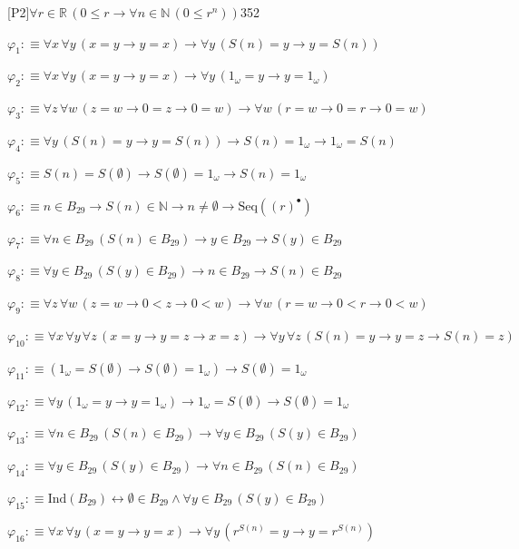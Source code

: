 \begin{fullproof}{[P2]}{$\forall r \in \mathbb{R}\,(0 \leq r \to \forall n \in \mathbb{N}\,(0 \leq {{r}^{n}}))$}{352}
\begin{ptree}
\end{ptree}
\begin{abbrevlist}
\item $\varphi_{1} :\equiv \forall x\,\forall y\,(x = y \to y = x) \to \forall y\,(S(n) = y \to y = S(n))$
\item $\varphi_{2} :\equiv \forall x\,\forall y\,(x = y \to y = x) \to \forall y\,(1_{\omega} = y \to y = 1_{\omega})$
\item $\varphi_{3} :\equiv \forall z\,\forall w\,(z = w \to 0 = z \to 0 = w) \to \forall w\,(r = w \to 0 = r \to 0 = w)$
\item $\varphi_{4} :\equiv \forall y\,(S(n) = y \to y = S(n)) \to S(n) = 1_{\omega} \to 1_{\omega} = S(n)$
\item $\varphi_{5} :\equiv S(n) = S(\emptyset) \to S(\emptyset) = 1_{\omega} \to S(n) = 1_{\omega}$
\item $\varphi_{6} :\equiv n \in B_{29} \to S(n) \in \mathbb{N} \to n \neq \emptyset \to \mathrm{Seq}({(r)^{\bullet}})$
\item $\varphi_{7} :\equiv \forall n \in B_{29}\,(S(n) \in B_{29}) \to y \in B_{29} \to S(y) \in B_{29}$
\item $\varphi_{8} :\equiv \forall y \in B_{29}\,(S(y) \in B_{29}) \to n \in B_{29} \to S(n) \in B_{29}$
\item $\varphi_{9} :\equiv \forall z\,\forall w\,(z = w \to 0 < z \to 0 < w) \to \forall w\,(r = w \to 0 < r \to 0 < w)$
\item $\varphi_{10} :\equiv \forall x\,\forall y\,\forall z\,(x = y \to y = z \to x = z) \to \forall y\,\forall z\,(S(n) = y \to y = z \to S(n) = z)$
\item $\varphi_{11} :\equiv (1_{\omega} = S(\emptyset) \to S(\emptyset) = 1_{\omega}) \to S(\emptyset) = 1_{\omega}$
\item $\varphi_{12} :\equiv \forall y\,(1_{\omega} = y \to y = 1_{\omega}) \to 1_{\omega} = S(\emptyset) \to S(\emptyset) = 1_{\omega}$
\item $\varphi_{13} :\equiv \forall n \in B_{29}\,(S(n) \in B_{29}) \to \forall y \in B_{29}\,(S(y) \in B_{29})$
\item $\varphi_{14} :\equiv \forall y \in B_{29}\,(S(y) \in B_{29}) \to \forall n \in B_{29}\,(S(n) \in B_{29})$
\item $\varphi_{15} :\equiv \mathrm{Ind}(B_{29}) \leftrightarrow \emptyset \in B_{29} \land \forall y \in B_{29}\,(S(y) \in B_{29})$
\item $\varphi_{16} :\equiv \forall x\,\forall y\,(x = y \to y = x) \to \forall y\,({{r}^{S(n)}} = y \to y = {{r}^{S(n)}})$

\end{abbrevlist}
\end{fullproof}
